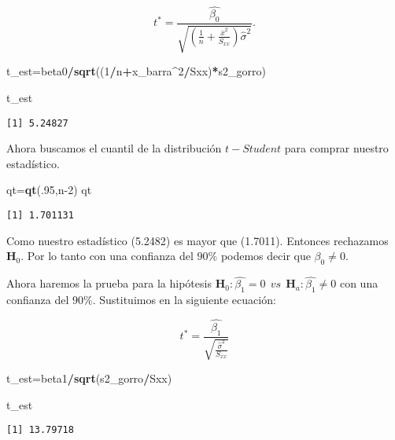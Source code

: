 \documentclass[
  a4paper,
  oneside,
  openany]{book}
\newenvironment{Shaded}{\begin{snugshade}}{\end{snugshade}}
\newcommand{\DecValTok}[1]{\textcolor[rgb]{0.00,0.00,0.81}{#1}}
\newcommand{\KeywordTok}[1]{\textcolor[rgb]{0.13,0.29,0.53}{\textbf{#1}}}
\newcommand{\NormalTok}[1]{#1}
\newcommand{\OperatorTok}[1]{\textcolor[rgb]{0.81,0.36,0.00}{\textbf{#1}}}
\begin{document}
\[t^*=\frac{\hat{\beta_{0}}}{\sqrt{\left(\frac{1}{n}+\frac{\overline{x}^2}{S_{xx}}\right)\hat{\sigma}^2}}.\]

\begin{Shaded}
\begin{Highlighting}[]
\NormalTok{t\_est=beta0}\OperatorTok{/}\KeywordTok{sqrt}\NormalTok{((}\DecValTok{1}\OperatorTok{/}\NormalTok{n}\OperatorTok{+}\NormalTok{x\_barra}\OperatorTok{\^{}}\DecValTok{2}\OperatorTok{/}\NormalTok{Sxx)}\OperatorTok{*}\NormalTok{s2\_gorro)}

\NormalTok{t\_est}
\end{Highlighting}
\end{Shaded}

\begin{verbatim}
[1] 5.24827
\end{verbatim}

Ahora buscamos el cuantil de la distribución \(t-Student\) para comprar nuestro estadístico.

\begin{Shaded}
\begin{Highlighting}[]
\NormalTok{qt=}\KeywordTok{qt}\NormalTok{(.}\DecValTok{95}\NormalTok{,n}\DecValTok{{-}2}\NormalTok{) }
\NormalTok{qt}
\end{Highlighting}
\end{Shaded}

\begin{verbatim}
[1] 1.701131
\end{verbatim}

Como nuestro estadístico (5.2482) es mayor que (1.7011). Entonces rechazamos \(\textbf{H}_0\). Por lo tanto con una confianza del \(90\%\) podemos decir que \(\beta_{0} \neq 0.\)

Ahora haremos la prueba para la hipótesis \(\textbf{H}_0:\hat{\beta_{1}}=0 \ \ vs \ \ \textbf{H}_{a}:\hat{\beta_{1}} \neq 0\) con una confianza del \(90\%\). Sustituimos en la siguiente ecuación:

\[t^*=\frac{\hat{\beta_{1}}}{\sqrt{\frac{\hat{\sigma}^2}{S_{xx}}}}\]

\begin{Shaded}
\begin{Highlighting}[]
\NormalTok{t\_est=beta1}\OperatorTok{/}\KeywordTok{sqrt}\NormalTok{(s2\_gorro}\OperatorTok{/}\NormalTok{Sxx)}

\NormalTok{t\_est}
\end{Highlighting}
\end{Shaded}

\begin{verbatim}
[1] 13.79718
\end{verbatim}
\end{document}
